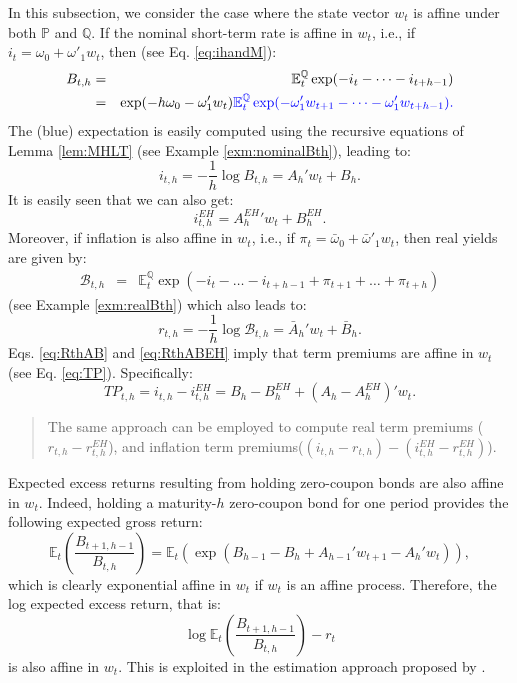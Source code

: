 \documentclass[
  12pt,
]{book}
\theoremstyle{definition}
\theoremstyle{definition}
\theoremstyle{definition}
\theoremstyle{definition}
\theoremstyle{remark}
\begin{document}
In this subsection, we consider the case where the state vector \(w_t\) is affine under both \(\mathbb{P}\) and \(\mathbb{Q}\). If the nominal short-term rate is affine in \(w_t\), i.e., if \(i_t = \omega_0 + \omega'_1 w_t\), then (see Eq. \eqref{eq:ihandM}):
\begin{eqnarray*}
B_{t,h} &=& \mathbb{E}^{\mathbb{Q}}_t \exp (-i_{t}-\dots-i_{t+h-1})\\
&=& \exp(-h\omega_0 - \omega'_1 w_t) \color{blue}{\mathbb{E}^{\mathbb{Q}}_t \exp (- \omega'_1 w_{t+1}-\dots- \omega'_1 w_{t+h-1})}.
\end{eqnarray*}
The (blue) expectation is easily computed using the recursive equations of Lemma \ref{lem:MHLT} (see Example \ref{exm:nominalBth}), leading to:
\begin{equation}
i_{t,h}= -  \frac{1}{h}   \log   B_{t,h} = A_h'w_t + B_h.\label{eq:RthAB}
\end{equation}
It is easily seen that we can also get:
\begin{equation}
i^{EH}_{t,h} = {A^{EH}_h}'w_t + B^{EH}_h.\label{eq:RthABEH}
\end{equation}
Moreover, if inflation is also affine in \(w_t\), i.e., if \(\pi_{t} = \bar\omega_0 + \bar\omega'_1 w_t\), then real yields are given by:
\begin{eqnarray*}
\mathcal{B}_{t,h} &=& \mathbb{E}^{\mathbb{Q}}_t \exp(-i_{t}-\dots-i_{t+h-1}+\pi_{t+1}+\dots+\pi_{t+h})
\end{eqnarray*}
(see Example \ref{exm:realBth}) which also leads to:
\begin{equation}
r_{t,h} = -  \frac{1}{h}   \log   \mathcal{B}_{t,h} = \bar{A}_h'w_t + \bar{B}_h.\label{eq:RbarthAB}
\end{equation}
Eqs. \eqref{eq:RthAB} and \eqref{eq:RthABEH} imply that term premiums are affine in \(w_t\) (see Eq. \eqref{eq:TP}). Specifically:
\[
TP_{t,h} = i_{t,h} - i^{EH}_{t,h} = B_h - B_h^{EH} + (A_h - A_h^{EH})'w_t.
\]

\begin{quote}
The same approach can be employed to compute real term premiums (\(r_{t,h} - r^{EH}_{t,h}\)), and inflation term premiums(\((i_{t,h}-r_{t,h}) - (i^{EH}_{t,h}-r^{EH}_{t,h})\)).
\end{quote}

Expected excess returns resulting from holding zero-coupon bonds are also affine in \(w_t\). Indeed, holding a maturity-\(h\) zero-coupon bond for one period provides the following expected gross return:
\[
\mathbb{E}_t\left(\frac{B_{t+1,h-1}}{B_{t,h}}\right) = \mathbb{E}_t\left(\exp(B_{h-1} - B_h + A_{h-1}'w_{t+1} - A_h'w_{t})\right),
\]
which is clearly exponential affine in \(w_t\) if \(w_t\) is an affine process. Therefore, the log expected excess return, that is:
\[
\log \mathbb{E}_t\left(\frac{B_{t+1,h-1}}{B_{t,h}}\right) - r_t
\]
is also affine in \(w_t\). This is exploited in the estimation approach proposed by \citet{Adrian_Crump_Moench_2013}.
\end{document}
